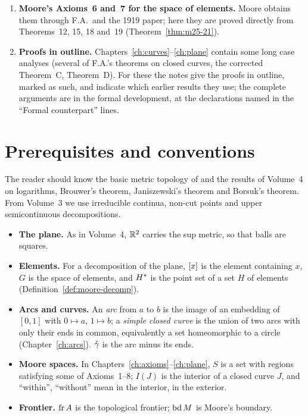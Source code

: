 \begin{enumerate}
The formal proof proves a general recognition theorem for squares (a compact set with two families of grid
lines, Theorem~\ref{thm:grid-square}), derives the Schoenflies theorem in a Moore space from Theorem~D, and
pastes squares and collars along an exhaustion (Chapter~\ref{ch:plane}); Theorems~E and~G become corollaries.
\item \textbf{Moore's Axioms~6 and~7 for the space of elements.} Moore obtains them through F.A.\ and the 1919
paper; here they are proved directly from Theorems~12, 15, 18 and~19 (Theorem~\ref{thm:m25-21}).
\item \textbf{Proofs in outline.} Chapters~\ref{ch:curves}--\ref{ch:plane} contain some long case analyses
(several of F.A.'s theorems on closed curves, the corrected Theorem~C, Theorem~D). For these the notes give
the proofs in outline, marked as such, and indicate which earlier results they use; the complete arguments are
in the formal development, at the declarations named in the ``Formal counterpart'' lines.
\end{enumerate}

\section{Prerequisites and conventions}\label{sec:intro-conv}

The reader should know the basic metric topology of  and the results of Volume~4 on
logarithms, Brouwer's theorem, Janiszewski's theorem and Borsuk's theorem. From Volume~3 we use
irreducible continua, non-cut points and upper semicontinuous decompositions.

\begin{itemize}
\item \textbf{The plane.} As in Volume~4, $\mathbb{R}^2$ carries the sup metric, so that balls are squares.
\item \textbf{Elements.} For a decomposition of the plane, $[x]$ is the element containing $x$, $G$ is the space of
elements, and $H^{\ast}$ is the point set of a set $H$ of elements (Definition~\ref{def:moore-decomp}).
\item \textbf{Arcs and curves.} An \emph{arc} from $a$ to $b$ is the image of an embedding of $[0,1]$ with $0\mapsto a$,
$1\mapsto b$; a \emph{simple closed curve} is the union of two arcs with only their ends in common, equivalently
a set homeomorphic to a circle (Chapter~\ref{ch:arcs}). $\mathring{\gamma}$ is the arc minus its ends.
\item \textbf{Moore spaces.} In Chapters~\ref{ch:axioms}--\ref{ch:plane}, $S$ is a set with regions satisfying some of
Axioms~1--8; $I(J)$ is the interior of a closed curve $J$, and ``within'', ``without'' mean in the interior,
in the exterior.
\item \textbf{Frontier.} $\operatorname{fr} A$ is the topological frontier; $\operatorname{bd} M$ is Moore's boundary.
\end{itemize}

